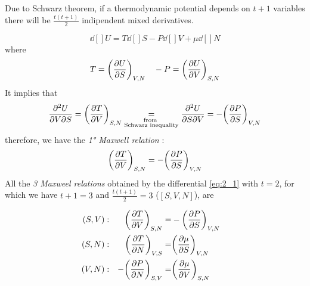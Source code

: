 \documentclass[../main/main.tex]{subfiles}
\begin{document}
Due to Schwarz theorem, if a thermodynamic potential depends on \( t+1 \) variables there will be \( \frac{t(t+1)}{2} \)  indipendent mixed derivatives.
\begin{example}[Internal energy \( U=U(S,V,N)\)]
\begin{equation}
  \dd[]{U} = T \dd[]{S} - P \dd[]{V} + \mu \dd[]{N}
  \label{eq:2_1}
\end{equation}
where
\begin{equation*}
  T = \qty(\pdv{U}{S} )_{V,N} \quad  -P = \qty(\pdv{U}{V} )_{S,N}
\end{equation*}
 It implies that
\begin{equation*}
        \pdv{U}{V}{S} = \qty(\pdv{T}{V} )_{S,N} \underset{\substack{ \text{from } \\  \text{Schwarz inequality} } }{=} \pdv{U}{S}{V}  =-\qty(\pdv{P}{S} )_{V,N}
\end{equation*}
therefore, we have the \emph{1° Maxwell relation} :
\begin{equation*}
  \qty(\pdv{T}{V} )_{S,N} = -\qty(\pdv{P}{S} )_{V,N}
\end{equation*}
All the \emph{3 Maxweel relations} obtained by the differential \eqref{eq:2_1}
with \( t=2 \), for which we have \( t+1=3 \) and \( \frac{t(t+1)}{2}=3 \) (\( [S,V,N] \)), are

\begin{subequations}
\begin{align}
  (S,V) &:& \qty(\pdv{T}{V} )_{S,N} =& - \qty(\pdv{P}{S} )_{V,N} & \\
  (S,N) &:& \qty(\pdv{T}{N} )_{V,S} =& \qty(\pdv{\mu }{S} )_{V,N} &\\
  (V,N) &:& -\qty(\pdv{P}{N} )_{S,V} =& \qty(\pdv{\mu }{V} )_{S,N} &
 \end{align}
\label{}
\end{subequations}
\end{example}
\end{document}
